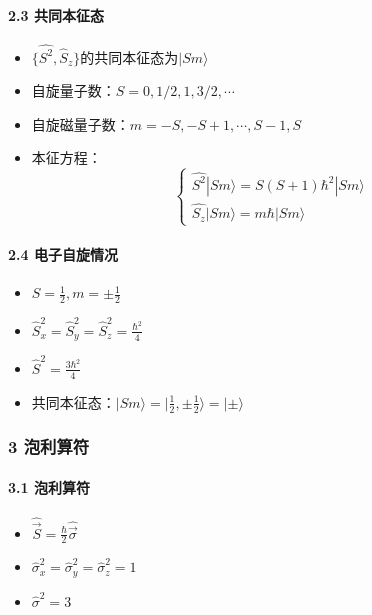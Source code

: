 \documentclass[UTF8,twocolumn]{ctexart}
\providecommand{\tightlist}{%
  \setlength{\itemsep}{0pt}\setlength{\parskip}{0pt}}
\let\oldparagraph\paragraph
\renewcommand{\paragraph}[1]{\oldparagraph{#1}\mbox{}}
\begin{document}
\hypertarget{ux5171ux540cux672cux5f81ux6001}{%
\paragraph{ 2.3 共同本征态}\label{ux5171ux540cux672cux5f81ux6001}}

\begin{itemize}
\tightlist
\item
  \(\{\hat{S^2},\hat{S}_z\}\)的共同本征态为\(|Sm\rangle\)
\item
  自旋量子数：\(S=0,1/2,1,3/2,\cdots\)
\item
  自旋磁量子数：\(m=-S,-S+1,\cdots,S-1,S\)
\item
  本征方程： \[\begin{cases}
    \hat{S^2}|Sm\rangle=S(S+1)\hbar^2|Sm\rangle \\
    \hat{S_z}|Sm\rangle=m\hbar|Sm\rangle
  \end{cases}\]
\end{itemize}

\hypertarget{ux7535ux5b50ux81eaux65cbux60c5ux51b5}{%
\paragraph{ 2.4
电子自旋情况}\label{ux7535ux5b50ux81eaux65cbux60c5ux51b5}}

\begin{itemize}
\tightlist
\item
  \(S=\frac{1}{2},m=\pm\frac{1}{2}\)
\item
  \(\hat{S}_x^2=\hat{S}_y^2=\hat{S}_z^2=\frac{\hbar^2}{4}\)
\item
  \(\hat{S}^2=\frac{3\hbar^2}{4}\)
\item
  共同本征态：\(|Sm\rangle=|\frac{1}{2},\pm\frac{1}{2}\rangle=|\pm\rangle\)
\end{itemize}

\hypertarget{ux6ce1ux5229ux7b97ux7b26}{%
\subsubsection{3 泡利算符}\label{ux6ce1ux5229ux7b97ux7b26}}

\hypertarget{ux6ce1ux5229ux7b97ux7b26-1}{%
\paragraph{ 3.1 泡利算符}\label{ux6ce1ux5229ux7b97ux7b26-1}}

\begin{itemize}
\tightlist
\item
  \(\hat{\vec{S}}=\frac{\hbar}{2}\hat{\vec{\sigma}}\)
\item
  \(\hat{\sigma}_x^2=\hat{\sigma}_y^2=\hat{\sigma}_z^2=1\)
\item
  \(\hat{\sigma}^2=3\)
\end{itemize}
\end{document}
